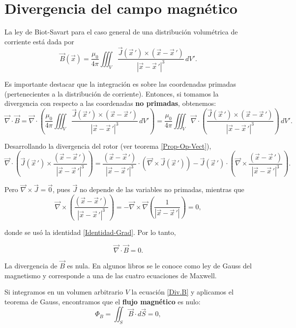 \section{Divergencia del campo magnético}

La ley de Biot-Savart para el caso general de una distribución volumétrica de corriente está dada por
$$\Vec{B}(\Vec{x}) = \frac{\mu_0}{4\pi} \iiint_{V} \frac{\Vec{J}(\Vec{x}\,') \times (\Vec{x} - \Vec{x}\,')}{|\Vec{x} - \Vec{x}\,'|^3} \,dV'.$$

Es importante destacar que la integración es sobre las coordenadas primadas (pertenecientes a la distribución de corriente). Entonces, si tomamos la divergencia con respecto a las coordenadas \textbf{no primadas}, obtenemos:
$$\Vec{\nabla} \cdot \Vec{B} =  \Vec{\nabla} \cdot \left( \frac{\mu_0}{4\pi} \iiint_V \frac{\Vec{J}(\Vec{x}\,') \times (\Vec{x} - \Vec{x}\,')}{|\Vec{x} - \Vec{x}\,'|^3} \,dV' \right) = \frac{\mu_0}{4\pi}  \iiint_V \Vec{\nabla} \cdot \left( \frac{\Vec{J}(\Vec{x}\,') \times (\Vec{x} - \Vec{x}\,')}{|\Vec{x} - \Vec{x}\,'|^3} \right) \,dV'.$$

Desarrollando la divergencia del rotor (ver teorema \ref{Prop-Op-Vect}),
$$\Vec{\nabla} \cdot \left( \Vec{J}(\Vec{x}\,') \times \frac{(\Vec{x} - \Vec{x}\,')}{|\Vec{x} - \Vec{x}\,'|^3}  \right) = \frac{(\Vec{x} - \Vec{x}\,')}{|\Vec{x} - \Vec{x}\,'|^3}  \cdot (\Vec{\nabla} \times \Vec{J}(\Vec{x}\,')) - \Vec{J}(\Vec{x}\,') \cdot \left(\Vec{\nabla} \times \frac{(\Vec{x} - \Vec{x}\,')}{|\Vec{x} - \Vec{x}\,'|^3}  \right).$$

Pero $\Vec{\nabla} \times \Vec{J} = \Vec{0}$, pues $\vec{J}$ no depende de las variables no primadas, mientras que 
$$\Vec{\nabla} \times \left(\frac{(\Vec{x} - \Vec{x}\,')}{|\Vec{x} - \Vec{x}\,'|^3} \right) = - \Vec{\nabla} \times \Vec{\nabla} \left( \frac{1}{|\Vec{x} - \Vec{x}\,'|}\right) = 0,$$

donde se usó la identidad \eqref{Identidad-Grad}. Por lo tanto,
\begin{shaded}
\begin{equation}
     \Vec{\nabla} \cdot \Vec{B} = 0.   \label{Div.B}
\end{equation}
\end{shaded}

La divergencia de $\Vec{B}$ es nula. En algunos libros se le conoce como ley de Gauss del magnetismo y corresponde a una de las cuatro ecuaciones de Maxwell.

Si integramos en un volumen arbitrario $V$ la ecuación \eqref{Div.B} y aplicamos el teorema de Gauss, encontramos que el  \textbf{flujo magnético} es nulo:
\begin{equation*}
\Phi_B = \iint_S \vec{B} \cdot d\vec{S} = 0,
\end{equation*}

